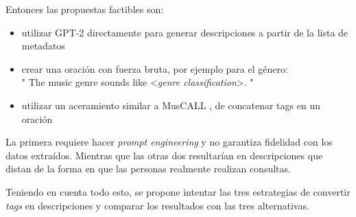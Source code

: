 Entonces las propuestas factibles son: 
\begin{itemize}
    \item utilizar GPT-2 directamente para generar descripciones a partir de la lista de metadatos
    \item crear una oración con fuerza bruta, por ejemplo para el género: \\" The music genre sounds like <\textit{genre classification}>. "
    \item utilizar un aceramiento similar a MusCALL \cite{Manco2022ContrastiveAL}, de concatenar tags en un oración
\end{itemize}
La primera requiere hacer \textit{prompt engineering} y no garantiza fidelidad con los datos extraídos. Mientras que las otras dos resultarían en descripciones que distan de la forma en que las personas realmente realizan consultas. 

Teniendo en cuenta todo esto, se propone intentar las tres estrategias de convertir \textit{tags} en descripciones y comparar los resultados con las tres alternativas.\\

